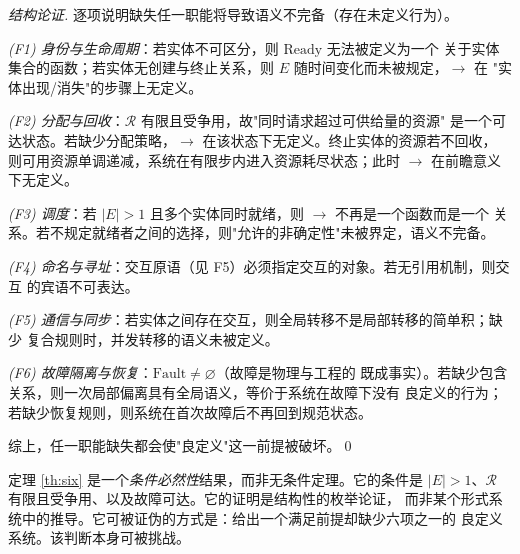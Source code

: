 \begin{proof}[结构论证]
逐项说明缺失任一职能将导致语义不完备（存在未定义行为）。

\emph{(F1) 身份与生命周期}：若实体不可区分，则 $\mathrm{Ready}$ 无法被定义为一个
关于实体集合的函数；若实体无创建与终止关系，则 $E$ 随时间变化而未被规定，$\to$ 在
"实体出现/消失"的步骤上无定义。

\emph{(F2) 分配与回收}：$\mathcal{R}$ 有限且受争用，故"同时请求超过可供给量的资源"
是一个可达状态。若缺少分配策略，$\to$ 在该状态下无定义。终止实体的资源若不回收，
则可用资源单调递减，系统在有限步内进入资源耗尽状态；此时 $\to$ 在前瞻意义下无定义。

\emph{(F3) 调度}：若 $|E| > 1$ 且多个实体同时就绪，则 $\to$ 不再是一个函数而是一个
关系。若不规定就绪者之间的选择，则"允许的非确定性"未被界定，语义不完备。

\emph{(F4) 命名与寻址}：交互原语（见 F5）必须指定交互的对象。若无引用机制，则交互
的宾语不可表达。

\emph{(F5) 通信与同步}：若实体之间存在交互，则全局转移不是局部转移的简单积；缺少
复合规则时，并发转移的语义未被定义。

\emph{(F6) 故障隔离与恢复}：$\mathrm{Fault} \ne \varnothing$（故障是物理与工程的
既成事实）。若缺少包含关系，则一次局部偏离具有全局语义，等价于系统在故障下没有
良定义的行为；若缺少恢复规则，则系统在首次故障后不再回到规范状态。

综上，任一职能缺失都会使"良定义"这一前提被破坏。\qed
\end{proof}

\begin{remark}[定理的性质]\label{rmk:six-nature}
定理 \ref{th:six} 是一个\emph{条件必然性}结果，而非无条件定理。它的条件是
$|E| > 1$、$\mathcal{R}$ 有限且受争用、以及故障可达。它的证明是结构性的枚举论证，
而非某个形式系统中的推导。它可被证伪的方式是：给出一个满足前提却缺少六项之一的
良定义系统。该判断本身可被挑战。
\end{remark}


